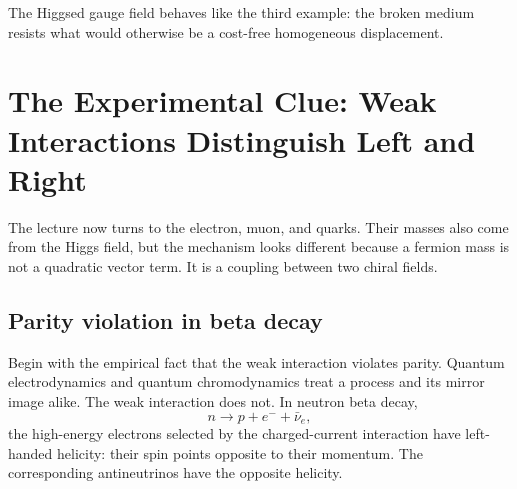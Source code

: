 The Higgsed gauge field behaves like the third example: the broken medium
resists what would otherwise be a cost-free homogeneous displacement.

\begin{classroomqa}
\end{classroomqa}

\begin{classroomqa}
\end{classroomqa}

\section{The Experimental Clue: Weak Interactions Distinguish Left and Right}

The lecture now turns to the electron, muon, and quarks. Their masses also
come from the Higgs field, but the mechanism looks different because a
fermion mass is not a quadratic vector term. It is a coupling between two
chiral fields.

\subsection{Parity violation in beta decay}

Begin with the empirical fact that the weak interaction violates parity.
Quantum electrodynamics and quantum chromodynamics treat a process and its
mirror image alike. The weak interaction does not. In neutron beta decay,
\begin{equation}
  n\longrightarrow p+e^-+\bar\nu_e,
  \label{eq:l09-beta-decay}
\end{equation}
the high-energy electrons selected by the charged-current interaction have
left-handed helicity: their spin points opposite to their momentum. The
corresponding antineutrinos have the opposite helicity.


